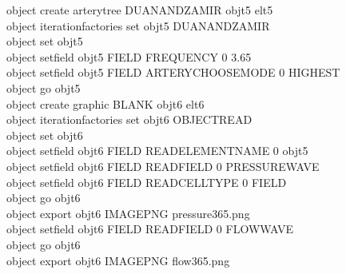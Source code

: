 \begin{appendices}
	\begin{algorithm}[H]
		\SetAlgoLined
		object create artery\underline{\space\space}tree DUAN\underline{\space\space}AND\underline{\space\space}ZAMIR obj\underline{\space\space}t5 el\underline{\space\space}t5 \\
		object iteration\underline{\space\space}factories set obj\underline{\space\space}t5 DUAN\underline{\space\space}AND\underline{\space\space}ZAMIR \\
		object set obj\underline{\space\space}t5 \\
		object set\underline{\space\space}field obj\underline{\space\space}t5 FIELD FREQUENCY 0 3.65 \\
		object set\underline{\space\space}field obj\underline{\space\space}t5 FIELD ARTERY\underline{\space\space}CHOOSE\underline{\space\space}MODE 0 HIGHEST \\
		object go obj\underline{\space\space}t5 \\
		object create graphic BLANK obj\underline{\space\space}t6 el\underline{\space\space}t6 \\
		object iteration\underline{\space\space}factories set obj\underline{\space\space}t6 OBJECT\underline{\space\space}READ \\
		object set obj\underline{\space\space}t6 \\
		object set\underline{\space\space}field obj\underline{\space\space}t6 FIELD READ\underline{\space\space}ELEMENT\underline{\space\space}NAME 0 obj\underline{\space\space}t5 \\
		object set\underline{\space\space}field obj\underline{\space\space}t6 FIELD READ\underline{\space\space}FIELD 0 PRESSURE\underline{\space\space}WAVE \\
		object set\underline{\space\space}field obj\underline{\space\space}t6 FIELD READ\underline{\space\space}CELL\underline{\space\space}TYPE 0 FIELD \\
		object go obj\underline{\space\space}t6 \\
		object export obj\underline{\space\space}t6 IMAGE\underline{\space\space}PNG pressure\underline{\space\space}3\underline{\space\space}65.png \\
		object set\underline{\space\space}field obj\underline{\space\space}t6 FIELD READ\underline{\space\space}FIELD 0 FLOW\underline{\space\space}WAVE \\
		object go obj\underline{\space\space}t6 \\
		object export obj\underline{\space\space}t6 IMAGE\underline{\space\space}PNG flow\underline{\space\space}3\underline{\space\space}65.png \\

\end{algorithm}
\end{appendices}
